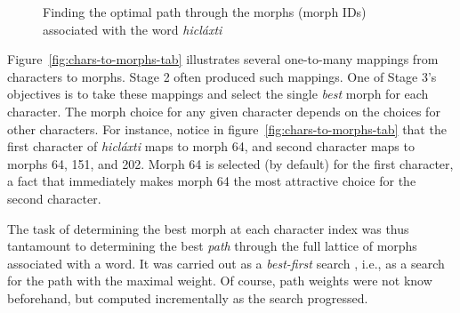 {\begin{figure}[t]
\begin{mdframed}
\label{fig:best-paths}
\caption{Finding the optimal path through the morphs (morph IDs) associated with the word \textit{hicl\'{a}xti}}
\end{mdframed}
\end{figure}
Figure~\ref{fig:chars-to-morphs-tab} illustrates several one-to-many mappings from 
characters to morphs. Stage 2 often produced such mappings.
One of Stage 3's objectives is to take these mappings and select the single \emph{best} morph for each character.
 The morph choice for any given character depends on the choices 
for other characters. For instance, notice in figure~\ref{fig:chars-to-morphs-tab} that the first 
character of \textit{hicl\'{a}xti} maps to morph 64, and second character maps to 
morphs  64, 151, and 202. Morph 64 is selected (by default) for the first character, 
a fact that immediately makes morph 64 the most attractive choice for the second character.

The task of determining the best morph at each character index was thus tantamount to determining the 
best \emph{path} through the full lattice of morphs associated with a word.
It was carried out as a
\emph{best-first} search \citep{pearl:1984}, i.e., as a search for the 
path with the maximal weight. Of course, path weights were not know beforehand, 
but computed incrementally as the search progressed. 

}
